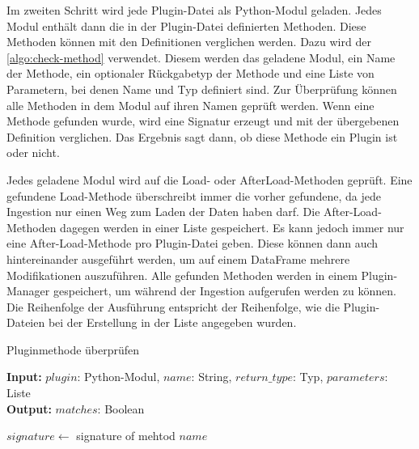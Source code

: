 Im zweiten Schritt wird jede Plugin-Datei als Python-Modul geladen.
Jedes Modul enthält dann die in der Plugin-Datei definierten Methoden.
Diese Methoden können mit den Definitionen verglichen werden.
Dazu wird der \cref{algo:check-method} verwendet.
Diesem werden das geladene Modul, ein Name der Methode, ein optionaler Rückgabetyp der Methode und eine Liste von Parametern, bei denen Name und Typ definiert sind.
Zur Überprüfung können alle Methoden in dem Modul auf ihren Namen geprüft werden.
Wenn eine Methode gefunden wurde, wird eine Signatur erzeugt und mit der übergebenen Definition verglichen.
Das Ergebnis sagt dann, ob diese Methode ein Plugin ist oder nicht.

Jedes geladene Modul wird auf die Load- oder AfterLoad-Methoden geprüft.
Eine gefundene Load-Methode überschreibt immer die vorher gefundene, da jede Ingestion nur einen Weg zum Laden der Daten haben darf.
Die After-Load-Methoden dagegen werden in einer Liste gespeichert.
Es kann jedoch immer nur eine After-Load-Methode pro Plugin-Datei geben.
Diese können dann auch hintereinander ausgeführt werden, um auf einem DataFrame mehrere Modifikationen auszuführen.
Alle gefunden Methoden werden in einem Plugin-Manager gespeichert, um während der Ingestion aufgerufen werden zu können.
Die Reihenfolge der Ausführung entspricht der Reihenfolge, wie die Plugin-Dateien bei der Erstellung in der Liste angegeben wurden.

\begin{algorithm}
    \caption{Pluginmethode überprüfen}
    \label{algo:check-method}

    \textbf{Input:} $plugin$: Python-Modul, $name$: String, $return\_type$: Typ, $parameters$: Liste \\
    \textbf{Output:} $matches$: Boolean \\


    $signature \gets$ signature of mehtod $name$




\end{algorithm}

